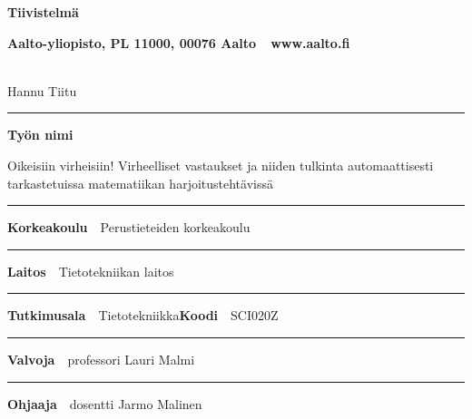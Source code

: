 \begin{spacing}{.88}

{\parindent0pt %

{\fontsize{13.9pt}{13.9pt}\selectfont
\vspace{-8.9mm}\hfill{\bfseries\sffamily\lsstyle Tiivistelmä}}

{\fontsize{9.48pt}{9.48pt}\selectfont
\vspace{.9mm}\hfill{\bfseries\sffamily\lsstyle Aalto-yliopisto, PL 11000, 00076 Aalto~~\textcolor{aaltoGray}{www.aalto.fi}}}

\\
{\small Hannu Tiitu}

\vspace{-2.4mm}\rule{\textwidth}{.75pt}

{\fontsize{10.5pt}{10.5pt}\bfseries\sffamily\lsstyle Työn nimi}\\
\parbox[t]{\textwidth}{\raggedright\small Oikeisiin virheisiin! Virheelliset vastaukset ja niiden tulkinta automaattisesti tarkastetuissa matematiikan harjoitustehtävissä}

\vspace{.5mm}\rule{\textwidth}{.75pt}

{\fontsize{10.5pt}{10.5pt}\bfseries\sffamily\lsstyle Korkeakoulu}~~{\small Perustieteiden korkeakoulu}

\vspace{-2.4mm}\rule{\textwidth}{.75pt}

{\fontsize{10.5pt}{10.5pt}\bfseries\sffamily\lsstyle Laitos}~~{\small Tietotekniikan laitos}

\vspace{-2.4mm}\rule{\textwidth}{.75pt}

{\fontsize{10.5pt}{10.5pt}\bfseries\sffamily\lsstyle Tutkimusala}~~{\small Tietotekniikka}\hfill{\fontsize{10.5pt}{10.5pt}\bfseries\sffamily\lsstyle Koodi}~~{\small SCI020Z}

\vspace{-2.4mm}\rule{\textwidth}{.75pt}

{\fontsize{10.5pt}{10.5pt}\bfseries\sffamily\lsstyle Valvoja}~~{\small professori Lauri Malmi}

\vspace{-2.4mm}\rule{\textwidth}{.75pt}

{\fontsize{10.5pt}{10.5pt}\bfseries\sffamily\lsstyle Ohjaaja}~~{\small dosentti Jarmo Malinen}

}
\end{spacing}
